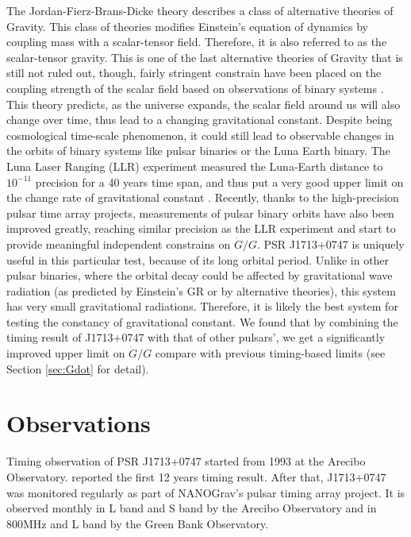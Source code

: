 The Jordan-Fierz-Brans-Dicke theory \citep{jor59,fie56,bd61} describes a class
of alternative theories of Gravity. 
This class of theories modifies Einstein's equation of dynamics by coupling
mass with a scalar-tensor
field. Therefore, it is also referred to as the scalar-tensor gravity. 
This is one of the last alternative theories of Gravity that is still not
ruled out, though, fairly stringent constrain have been placed on the coupling
strength of the scalar field based on observations of binary systems
\citep{hmb10, lwj+09, fwe+12}.
This theory predicts, as the universe expands, the scalar field around us will
also change over time, thus lead to a changing gravitational constant. Despite
being cosmological time-scale phenomenon, it could still lead to observable 
changes in the orbits of binary systems like pulsar binaries or the
Luna Earth binary. The Luna Laser Ranging (LLR) experiment measured the
Luna-Earth distance to $10^{-11}$ precision for a 40 years time span, and thus put a
very good upper limit on the change rate of gravitational constant
\citep{hmb10}. Recently, thanks to the high-precision pulsar time array
projects, measurements of pulsar binary orbits have also been improved
greatly, reaching similar precision as the LLR experiment and start to provide
meaningful independent constrains on $\dot{G}/G$. PSR J1713+0747 is uniquely
useful in this particular test, because of its long orbital period. Unlike in
other pulsar binaries, where the orbital decay could be affected by
gravitational wave radiation (as predicted by Einstein's GR or by 
alternative theories), this system has very small gravitational radiations. 
Therefore, it is likely the best system for testing the constancy of
gravitational constant. We found that by combining the timing result of
J1713+0747 with that of other pulsars', we get a significantly improved upper limit
on $\dot{G}/G$ compare with previous timing-based limits (see Section
\ref{sec:Gdot} for detail).


\section{Observations}
Timing observation of PSR J1713+0747 started from 1993 at the Arecibo
Observatory. \citet{sns+05} reported the first 12 years timing result. After
that, J1713+0747 was monitored regularly as part of  NANOGrav's pulsar timing
array project. It is observed monthly in L band and S band by the Arecibo Observatory and in 800MHz and L band by the Green Bank Observatory.

